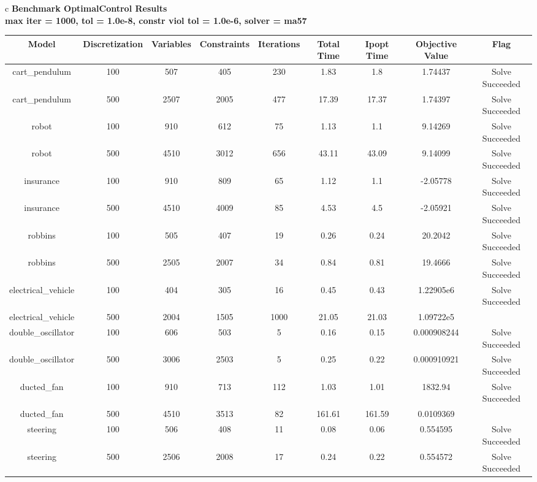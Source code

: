 \documentclass{standalone}
\begin{document}
\begin{tabular}{c}
\Large\textbf{Benchmark OptimalControl Results}\\
\large\textbf{max iter = 1000, tol = 1.0e-8, constr viol tol = 1.0e-6, solver = ma57}\\
\begin{tabular}{ccccccccc}
  \hline
  \textbf{Model} & \textbf{Discretization} & \textbf{Variables} & \textbf{Constraints} & \textbf{Iterations} & \textbf{Total Time} & \textbf{Ipopt Time} & \textbf{Objective Value} & \textbf{Flag} \\\hline
  cart\_pendulum & 100 & 507 & 405 & 230 & 1.83 & 1.8 & 1.74437 & Solve Succeeded \\
  cart\_pendulum & 500 & 2507 & 2005 & 477 & 17.39 & 17.37 & 1.74397 & Solve Succeeded \\
  robot & 100 & 910 & 612 & 75 & 1.13 & 1.1 & 9.14269 & Solve Succeeded \\
  robot & 500 & 4510 & 3012 & 656 & 43.11 & 43.09 & 9.14099 & Solve Succeeded \\
  insurance & 100 & 910 & 809 & 65 & 1.12 & 1.1 & -2.05778 & Solve Succeeded \\
  insurance & 500 & 4510 & 4009 & 85 & 4.53 & 4.5 & -2.05921 & Solve Succeeded \\
  robbins & 100 & 505 & 407 & 19 & 0.26 & 0.24 & 20.2042 & Solve Succeeded \\
  robbins & 500 & 2505 & 2007 & 34 & 0.84 & 0.81 & 19.4666 & Solve Succeeded \\
  electrical\_vehicle & 100 & 404 & 305 & 16 & 0.45 & 0.43 & 1.22905e6 & Solve Succeeded \\
  electrical\_vehicle & 500 & 2004 & 1505 & 1000 & 21.05 & 21.03 & 1.09722e5 & \color{red}{Iterations Exceeded} \\
  double\_oscillator & 100 & 606 & 503 & 5 & 0.16 & 0.15 & 0.000908244 & Solve Succeeded \\
  double\_oscillator & 500 & 3006 & 2503 & 5 & 0.25 & 0.22 & 0.000910921 & Solve Succeeded \\
  ducted\_fan & 100 & 910 & 713 & 112 & 1.03 & 1.01 & 1832.94 & Solve Succeeded \\
  ducted\_fan & 500 & 4510 & 3513 & 82 & 161.61 & 161.59 & 0.0109369 & \color{red}{Infeasible Problem} \\
  steering & 100 & 506 & 408 & 11 & 0.08 & 0.06 & 0.554595 & Solve Succeeded \\
  steering & 500 & 2506 & 2008 & 17 & 0.24 & 0.22 & 0.554572 & Solve Succeeded \\

\end{tabular}
\end{tabular}
\end{document}
